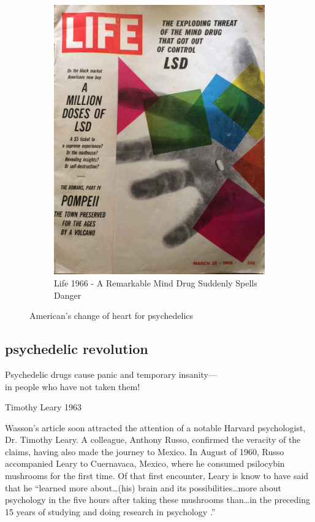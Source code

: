 \documentclass{UIdahoMastersThesis}
\begin{document}
\begin{figure}[h!]
\begin{subfigure}[b]{0.4\linewidth}
    \includegraphics[width=\linewidth]{life66.png}
    \caption{Life 1966 - A Remarkable Mind Drug Suddenly Spells Danger}
  \end{subfigure}
  \caption{American's change of heart for psychedelics}
  \label{fig:hofmann}
\end{figure}

\subsection{psychedelic revolution}
\epigraph {Psychedelic drugs cause panic and temporary insanity---\\
in people who have not taken them!}{Timothy Leary 1963}

\vspace{9mm}

Wasson's article soon attracted the attention of a notable Harvard psychologist, Dr. Timothy Leary. A colleague, Anthony Russo, confirmed the veracity of the claims, having also made the journey to Mexico. In August of 1960, Russo accompanied Leary to Cuernavaca, Mexico, where he consumed psilocybin mushrooms for the first time. Of that first encounter, Leary is know to have said that he \enquote{learned more about\ldots (his) brain and its possibilities\ldots more about psychology in the five hours after taking these mushrooms than\ldots in the preceding 15 years of studying and doing research in psychology \cite{dassfierce}.} 
\end{document}
